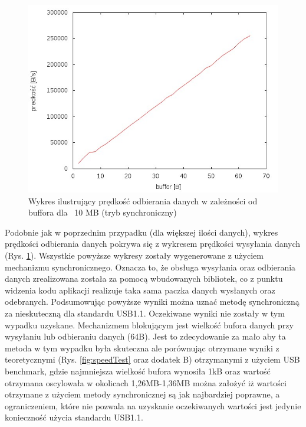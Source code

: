 \documentclass{BscUS}
\begin{document}
\begin{figure}[h]
{
\centering
\includegraphics[width=1\textwidth]{./img/S_10737420Receive}
\caption{Wykres ilustrujący prędkość odbierania danych w zależności od buffora dla ~10 MB (tryb synchroniczny)}
\label{fig:S_10737420Receive}
}
\end{figure}
\noindent Podobnie jak w poprzednim przypadku (dla większej ilości danych), wykres prędkości odbierania danych pokrywa się z wykresem prędkości wysyłania danych (Rys. \ref{fig:S_10737420Receive}).
\newpage %
\indent Wszystkie powyższe wykresy zostały wygenerowane z użyciem mechanizmu synchronicznego. Oznacza to, że obsługa wysyłania oraz odbierania danych zrealizowana została za pomocą wbudowanych bibliotek, co z punktu widzenia kodu aplikacji  realizuje taka sama paczka danych wysłanych oraz odebranych. Podsumowując powyższe wyniki można uznać metodę synchroniczną za nieskuteczną dla standardu USB1.1. Oczekiwane wyniki nie zostały w tym wypadku uzyskane. Mechanizmem blokującym jest wielkość bufora danych przy wysyłaniu lub odbieraniu danych (64B). Jest to zdecydowanie za mało aby ta metoda w tym wypadku była skuteczna ale porównując otrzymane wyniki z teoretycznymi (Rys. \ref{fig:speedTest} oraz dodatek B) otrzymanymi z użyciem USB benchmark, gdzie najmniejsza wielkość bufora wynosiła 1kB oraz wartość otrzymana oscylowała w okolicach 1,26MB-1,36MB można założyć iż wartości otrzymane z użyciem metody synchronicznej są jak najbardziej poprawne, a ograniczeniem, które nie pozwala na uzyskanie oczekiwanych wartości jest jedynie konieczność użycia standardu USB1.1.
\end{document}
